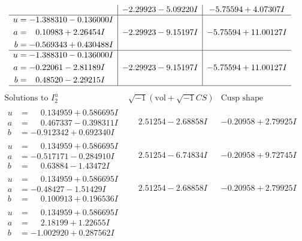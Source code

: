 \documentclass[1p]{elsarticle_modified}
\theoremstyle{definition}
\newcommand{\I}{\sqrt{-1}}
\begin{document}
$$\begin{array}{c|c|c}
 & -2.29923 - 5.09220 I & -5.75594 + 4.07307 I \\ \hline\begin{aligned}
u &= -1.388310 - 0.136000 I \\
a &= \phantom{-}0.10983 + 2.26454 I \\
b &= -0.569343 + 0.430488 I\end{aligned}
 & -2.29923 - 9.15197 I & -5.75594 + 11.00127 I \\ \hline\begin{aligned}
u &= -1.388310 - 0.136000 I \\
a &= -0.22061 - 2.81189 I \\
b &= \phantom{-}0.48520 - 2.29215 I\end{aligned}
 & -2.29923 - 9.15197 I & -5.75594 + 11.00127 I\\
 \hline 
 \end{array}$$\newpage$$\begin{array}{c|c|c}  
\text{Solutions to }I^u_{2}& \I (\text{vol} + \sqrt{-1}CS) & \text{Cusp shape}\\
 \hline 
\begin{aligned}
u &= \phantom{-}0.134959 + 0.586695 I \\
a &= \phantom{-}0.467337 - 0.398311 I \\
b &= -0.912342 + 0.692340 I\end{aligned}
 & \phantom{-}2.51254 - 2.68858 I & -0.20958 + 2.79925 I \\ \hline\begin{aligned}
u &= \phantom{-}0.134959 + 0.586695 I \\
a &= -0.517171 - 0.284910 I \\
b &= \phantom{-}0.63884 - 1.43472 I\end{aligned}
 & \phantom{-}2.51254 - 6.74834 I & -0.20958 + 9.72745 I \\ \hline\begin{aligned}
u &= \phantom{-}0.134959 + 0.586695 I \\
a &= -0.48427 - 1.51429 I \\
b &= \phantom{-}0.100913 + 0.196536 I\end{aligned}
 & \phantom{-}2.51254 - 2.68858 I & -0.20958 + 2.79925 I \\ \hline\begin{aligned}
u &= \phantom{-}0.134959 + 0.586695 I \\
a &= \phantom{-}2.18199 + 1.22655 I \\
b &= -1.002920 + 0.287562 I\end{aligned}

\end{array}$$
\end{document}
